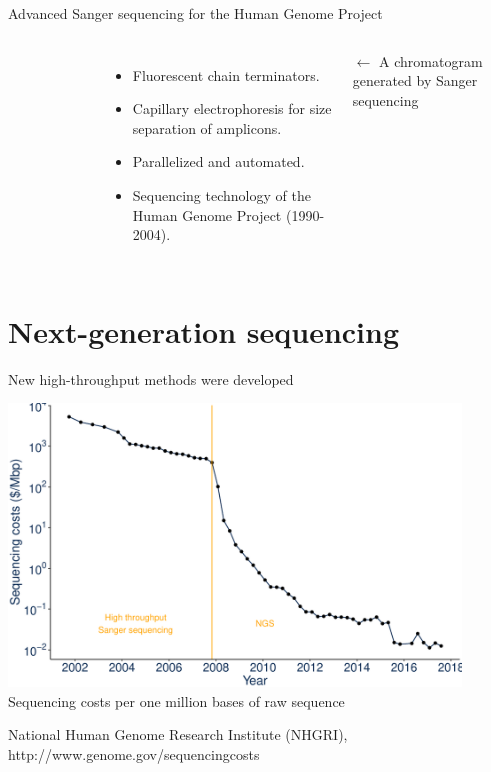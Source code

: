\documentclass[10pt]{beamer}
\newcommand{\credit}[1]{{\vspace{\fill} \par \raggedleft \scriptsize \mdseries \color{mDarkBrown} #1 \par}}
\begin{document}
\begin{frame}{Advanced Sanger sequencing for the Human Genome Project}
\begin{columns}[T,onlytextwidth]
\begin{figure}
		\end{figure}
		\vspace{0.2cm}
		\begin{itemize}
			\item Fluorescent chain terminators.
			\item Capillary electrophoresis for size separation of amplicons.
			\item Parallelized and automated.
			\item Sequencing technology of the Human Genome Project (1990-2004).
		\end{itemize}
		\par \vspace{0.5cm}
		\credit{$\leftarrow$ A chromatogram generated by Sanger sequencing}
	\end{columns}
\end{frame}


\section{Next-generation sequencing}


\begin{frame}{New high-throughput methods were developed}
	\begin{center}
		\includegraphics[width=0.9\textwidth]{./figures/sequencingcosts2018eng.pdf} \\
		Sequencing costs per one million bases of raw sequence
	\end{center}
	\credit{National Human Genome Research Institute (NHGRI), http://www.genome.gov/sequencingcosts}
\end{frame}
\end{document}
